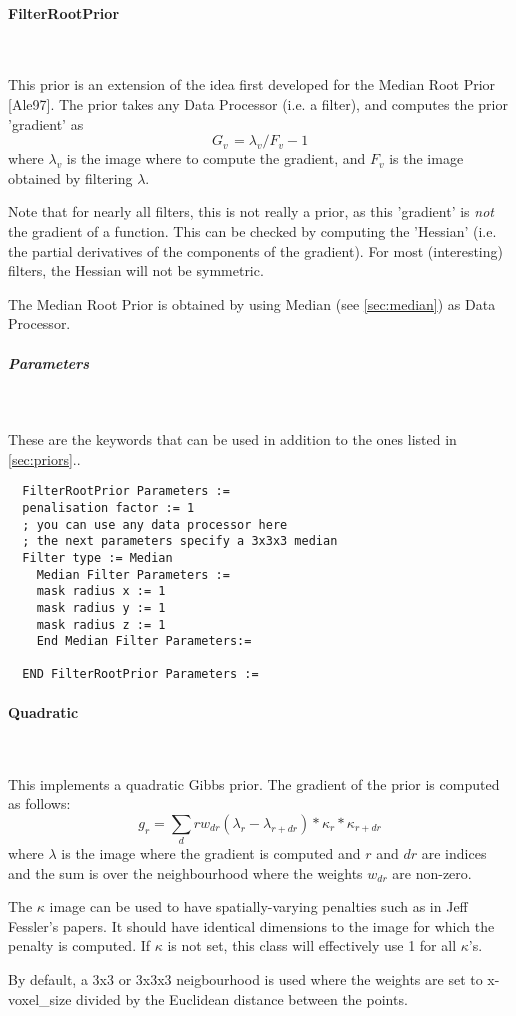 \documentclass{article}
\newcommand{\subsubsubsection}[1]{\paragraph{#1}\mbox{} \\}
\newcommand{\subsubsubsubsection}[1]{\subparagraph{#1} \mbox{} \\}
\begin{document}
{{{{ \subsubsubsection{FilterRootPrior}
}
This prior is an extension of the idea first developed for the 
Median Root Prior [Ale97]. The prior takes any Data Processor 
(i.e. a filter), and computes the prior 'gradient' as 
\[
G_{v\,} =\lambda _{v} /F_{v}  -1
\]
\noindent where 
$\lambda _{v} $
 is the image where to compute the gradient, and 
$F_{v} $ is the image obtained by filtering $\lambda $.

Note that for nearly all filters, this is not really a prior, as 
this 'gradient' is \textit{not} the gradient of a function. This can 
be checked by computing the 'Hessian' (i.e. the partial derivatives 
of the components of the gradient). For most (interesting) filters, 
the Hessian will not be symmetric.


The Median Root Prior is obtained by using Median (see \ref{sec:median}) 
as Data Processor.

{ \subsubsubsubsection{Parameters}
}
These are the keywords that can be used in addition to the ones listed in \ref{sec:priors}..
  \begin{verbatim}
  FilterRootPrior Parameters :=
  penalisation factor := 1
  ; you can use any data processor here
  ; the next parameters specify a 3x3x3 median
  Filter type := Median
    Median Filter Parameters :=
    mask radius x := 1   
    mask radius y := 1
    mask radius z := 1
    End Median Filter Parameters:=

  END FilterRootPrior Parameters :=
 \end{verbatim}


{ \subsubsubsection{Quadratic}
}
This implements a quadratic Gibbs prior. The gradient of the prior is computed as follows:
 \[
  g_r = \sum_dr w_{dr} (\lambda_r - \lambda_{r+dr}) * \kappa_r * \kappa_{r+dr}
  \]
  \noindent where $\lambda$ is the image where the gradient is computed
   and $r$ and $dr$ are indices and the sum
  is over the neighbourhood where the weights $w_{dr}$ are non-zero.

  The $\kappa$ image can be used to have spatially-varying penalties such as in 
  Jeff Fessler's papers. It should have identical dimensions to the image for which the
  penalty is computed. If $\kappa$ is not set, this class will effectively
  use 1 for all $\kappa$'s.

  By default, a 3x3 or 3x3x3 neigbourhood is used where the weights are set to 
  x-voxel\_size divided by the Euclidean distance between the points.
 
}}}
\end{document}
